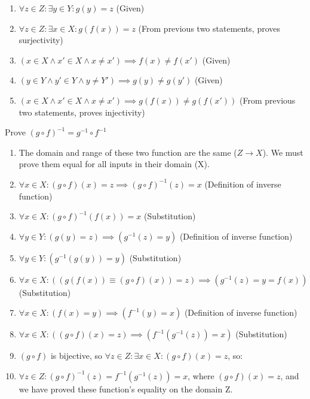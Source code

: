 \documentclass{article}
\begin{document}
\begin{enumerate}
\begin{enumerate}
                \item $\forall z \in Z: \exists y \in Y: g(y) = z$ (Given)
                \item $\forall z \in Z: \exists x \in X: g(f(x)) = z$ (From previous two statements, proves surjectivity)
                \item $(x \in X \land x' \in X \land x \neq x') \implies f(x) \neq f(x')$ (Given)
                \item $(y \in Y \land y' \in Y \land y \neq Y') \implies g(y) \neq g(y')$ (Given)
                \item $(x \in X \land x' \in X \land x \neq x') \implies g(f(x)) \neq g(f(x'))$ (From previous two statements, proves injectivity)
            \end{enumerate}
            Prove ${(g \circ f)}^{-1} = g^{-1} \circ f^{-1}$
            \begin{enumerate}
                \item The domain and range of these two function are the same ($Z \rightarrow X$). We must prove them equal for all inputs in their domain (X).
                \item $\forall x \in X: (g \circ f)(x) = z \implies {(g \circ f)}^{-1}(z) = x$ (Definition of inverse function)
                \item $\forall x \in X: {(g \circ f)}^{-1}(f(x)) = x$ (Substitution)
                \item $\forall y \in Y: (g(y) = z) \implies (g^{-1}(z) = y)$ (Definition of inverse function)
                \item $\forall y \in Y: (g^{-1}(g(y)) = y)$ (Substitution)
                \item $\forall x \in X: ((g(f(x)) \equiv (g \circ f)(x)) = z) \implies (g^{-1}(z) = y = f(x))$ (Substitution)
                \item $\forall x \in X: (f(x) = y) \implies (f^{-1}(y) = x)$ (Definition of inverse function)
                \item $\forall x \in X: ((g \circ f)(x) = z) \implies (f^{-1}(g^{-1}(z)) = x)$ (Substitution)
                \item $(g \circ f)$ is bijective, so $\forall z \in Z: \exists x \in X: (g \circ f)(x) = z$, so:
                \item $\forall z \in Z: {(g \circ f)}^{-1}(z) = f^{-1}(g^{-1}(z)) = x$, where $(g \circ f)(x) = z$, and we have proved these function's equality on the domain Z.
            \end{enumerate}

\end{enumerate}
\end{document}

